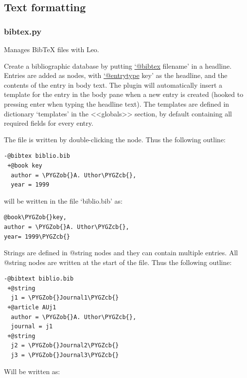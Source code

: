 \documentclass[a4paper,10pt,english]{sphinxmanual}
\def\PYGZob{\char`\{}
\def\PYGZcb{\char`\}}
\begin{document}
\subsection{Text formatting}
\label{plugins:text-formatting}

\subsubsection{bibtex.py}
\label{plugins:bibtex-py}
Manages BibTeX files with Leo.

Create a bibliographic database by
putting \href{mailto:'@bibtex}{`@bibtex} filename' in a headline. Entries are added as nodes, with
\href{mailto:'@entrytype}{`@entrytype} key' as the headline, and the contents of the entry in body text.
The plugin will automatically insert a template for the entry in the body pane
when a new entry is created (hooked to pressing enter when typing the headline
text). The templates are defined in dictionary `templates' in the \textless{}\textless{}globals\textgreater{}\textgreater{}
section, by default containing all required fields for every entry.

The file is written by double-clicking the node. Thus the following outline:

\begin{Verbatim}[commandchars=\\\{\}]
-@bibtex biblio.bib
 +@book key
  author = \PYGZob{}A. Uthor\PYGZcb{},
  year = 1999
\end{Verbatim}

will be written in the file `biblio.bib' as:

\begin{Verbatim}[commandchars=\\\{\}]
@book\PYGZob{}key,
author = \PYGZob{}A. Uthor\PYGZcb{},
year= 1999\PYGZcb{}
\end{Verbatim}

Strings are defined in @string nodes and they can contain multiple entries.
All @string nodes are written at the start of the file. Thus the following
outline:

\begin{Verbatim}[commandchars=\\\{\}]
-@bibtext biblio.bib
 +@string
  j1 = \PYGZob{}Journal1\PYGZcb{}
 +@article AUj1
  author = \PYGZob{}A. Uthor\PYGZcb{},
  journal = j1
 +@string
  j2 = \PYGZob{}Journal2\PYGZcb{}
  j3 = \PYGZob{}Journal3\PYGZcb{}
\end{Verbatim}

Will be written as:
\end{document}
